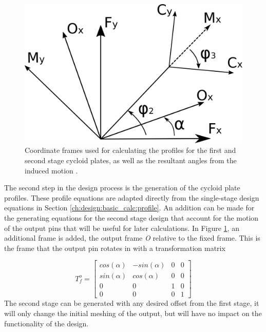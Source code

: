 \begin{figure}[t]
	\centering
	\includegraphics[width=0.50\linewidth]{fig/two_stage_frames}
   \caption{Coordinate frames used for calculating the profiles for the first and second stage cycloid plates, as well as the resultant angles from the induced motion \textalpha.}
   \label{fig:two_stage_frame}
\end{figure}

The second step in the design process is the generation of the cycloid plate profiles. These profile equations are adapted directly from the single-stage design equations in Section \ref{ch:design:basic_calc:profile}. An addition can be made for the generating equations for the second stage design that account for the motion of the output pins that will be useful for later calculations. In Figure \ref{fig:two_stage_frame}, an additional frame is added, the output frame \textit{O} relative to the fixed frame. This is the frame that the output pin rotates in with a transformation matrix 

\begin{equation} \label{eq:T_fo}
T_f^o = \left[{\begin{array}{cccc}
		cos(\alpha) & -sin(\alpha) & 0 & 0\\
		sin(\alpha) & cos(\alpha) & 0 & 0\\
		0 & 0 & 1 & 0\\
		0 & 0 & 0 & 1 \end{array} } \right]
\end{equation}
The second stage can be generated with any desired offset from the first stage, it will only change the initial meshing of the output, but will have no impact on the functionality of the design. 

